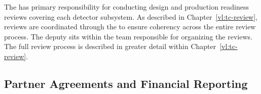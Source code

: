 The  has primary responsibility for conducting design
and production readiness reviews covering each detector subsystem.
As described in Chapter~\ref{vl:tc-review}, reviews are coordinated
through the  to ensure coherency across the entire review
process.  The deputy  sits within the  team
responsible for organizing the reviews.  The full review process is
described in greater detail within Chapter~\ref{vl:tc-review}.


\subsection{Partner Agreements and Financial Reporting}








